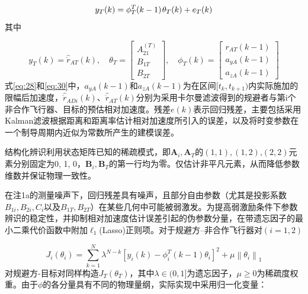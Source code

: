 \begin{equation}
\label{eq:29}
{y_T}(k) = \phi _T^T(k - 1){\kern 1pt} {\theta _T}(k) + {e_T}(k)
\end{equation}
其中

\begin{equation}
\label{eq:30}
{y_T}(k) = {\hat \ddot r_{AT}}(k),\quad {\theta _T} = \left[ {\begin{array}{*{20}{c}}
  {A_{21}^{(T)}} \\ 
  {{B_{1T}}} \\ 
  {{B_{2T}}} 
\end{array}} \right],\quad {\phi _T}(k) = \left[ {\begin{array}{*{20}{c}}
  {{r_{AT}}(k - 1)} \\ 
  {{a_{yA}}(k - 1)} \\ 
  {{a_{zA}}(k - 1)} 
\end{array}} \right]
\end{equation}
式\eqref{eq:28}和\eqref{eq:30}中，${a_{yA}}(k - 1)$和${a_{zA}}(k - 1)$为在区间$[{t_k},{t_{k + 1}})$内实际施加的限幅后加速度，${\hat \ddot r_{ADi}}(k)$、${\hat \ddot r_{AT}}(k)$分别为采用卡尔曼滤波得到的规避者与第i个非合作飞行器、目标的预估相对加速度。残差$e(k)$表示回归残差，主要包括采用Kalman滤波根据距离和距离率估计相对加速度所引入的误差，以及将时变参数在一个制导周期内近似为常数所产生的建模误差。

结构化辨识利用状态矩阵已知的稀疏模式，即${{\mathbf{A}}_i},{{\mathbf{A}}_T}$的$(1,1),(1,2){\text{,}}(2,2)$元素分别固定为0, 1, 0，${{\mathbf{B}}_i},{{\mathbf{B}}_T}$的第一行均为零。仅估计非平凡元素，从而降低参数维数并保证物理一致性。

在注1a的测量噪声下，回归残差具有噪声，且部分自由参数（尤其是投影系数${B_{1i}},{B_{2i}},{C_i}$以及${B_{1T}},{B_{2T}}$）在某些几何中可能被弱激发。为提高弱激励条件下参数辨识的稳定性，并抑制相对加速度估计误差引起的伪参数分量，在带遗忘因子的最小二乘代价函数中附加${\ell _1}$(Lasso)正则项。对于规避方–非合作飞行器对$(i = 1,2)$

\begin{equation}
\label{eq:31}
{J_i}({\theta _i}) = \sum\limits_{k = 1}^N {{\lambda ^{N - k}}} {\left[ {{y_i}(k) - \phi _i^T(k - 1){\theta _i}} \right]^2} + \mu {\left\| {{\theta _i}} \right\|_1}
\end{equation}
对规避方-目标对同样构造${J_T}({\theta _T})$，其中$\lambda  \in (0,1]$为遗忘因子，$\mu  \geqslant 0$为稀疏度权重。由于$\phi $的各分量具有不同的物理量纲，实际实现中采用归一化变量：

